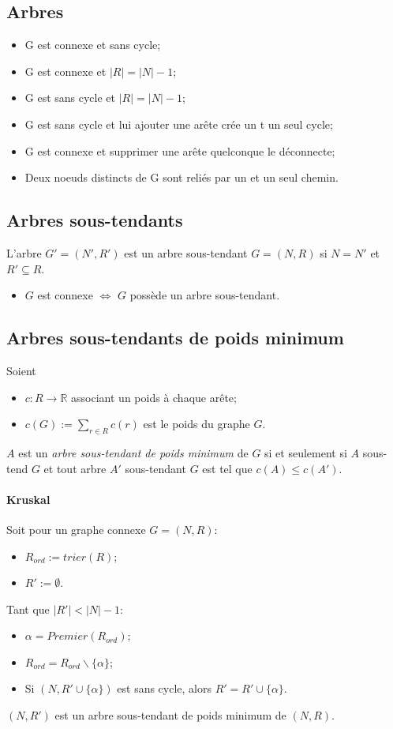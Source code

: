 \subsection{Arbres}
\begin{itemize}
  \item G est connexe et sans cycle;
  \item G est connexe et $|R| = |N| - 1$;
  \item G est sans cycle et $|R| = |N| - 1$;
  \item G est sans cycle et lui ajouter une arête crée un t un seul cycle;
  \item G est connexe et supprimer une arête quelconque le déconnecte;
  \item Deux noeuds distincts de G sont reliés par un et un seul chemin.
\end{itemize}

\subsection{Arbres sous-tendants}
L'arbre $G' = (N', R')$ est un arbre sous-tendant
$G = (N,R)$ si $N = N'$ et $R' \subseteq R$.

\begin{itemize}
  \item $G$ est connexe $\Leftrightarrow$ $G$ possède un arbre sous-tendant.
\end{itemize}

\subsection{Arbres sous-tendants de poids minimum}
Soient
\begin{itemize}
  \item $c : R \rightarrow \mathbb{R}$ associant un poids à chaque arête;
  \item $c(G) := \sum_{r \in R}c(r)$ est le poids du graphe $G$.
\end{itemize}
$A$ est un \emph{arbre sous-tendant de poids minimum} de $G$
si et seulement si $A$ sous-tend $G$ et tout arbre
$A'$ sous-tendant $G$ est tel que $c(A) \leq c(A')$.

\paragraph{Kruskal}
Soit pour un graphe connexe $G = (N,R)$:
\begin{itemize}
  \item $R_{ord} := trier(R)$;
  \item $R' := \emptyset$.
\end{itemize}
Tant que $|R'| < |N| - 1$:
\begin{itemize}
  \item $\alpha = Premier(R_{ord})$;
  \item $R_{ord} = R_{ord}\backslash\{\alpha\}$;
  \item Si $(N, R' \cup \{\alpha\})$ est sans cycle,
    alors $R' = R' \cup \{\alpha\}$.
\end{itemize}
$(N, R')$ est un arbre sous-tendant de poids minimum de $(N, R)$.

